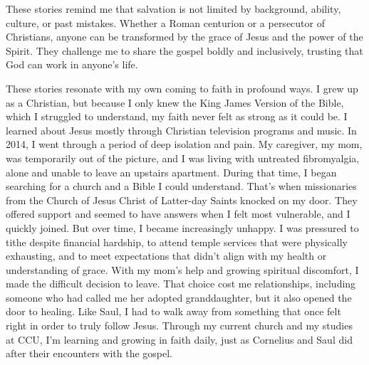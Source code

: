 \documentclass[12pt,letterpaper]{article}
\begin{document}
These stories remind me that salvation is not limited by background, ability, culture, or past mistakes. Whether a Roman centurion or a persecutor of Christians, anyone can be transformed by the grace of Jesus and the power of the Spirit. They challenge me to share the gospel boldly and inclusively, trusting that God can work in anyone’s life.

These stories resonate with my own coming to faith in profound ways. I grew up as a Christian, but because I only knew the King James Version of the Bible, which I struggled to understand, my faith never felt as strong as it could be. I learned about Jesus mostly through Christian television programs and music. In 2014, I went through a period of deep isolation and pain. My caregiver, my mom, was temporarily out of the picture, and I was living with untreated fibromyalgia, alone and unable to leave an upstairs apartment. During that time, I began searching for a church and a Bible I could understand. That’s when missionaries from the Church of Jesus Christ of Latter-day Saints knocked on my door. They offered support and seemed to have answers when I felt most vulnerable, and I quickly joined. But over time, I became increasingly unhappy. I was pressured to tithe despite financial hardship, to attend temple services that were physically exhausting, and to meet expectations that didn’t align with my health or understanding of grace. With my mom’s help and growing spiritual discomfort, I made the difficult decision to leave. That choice cost me relationships, including someone who had called me her adopted granddaughter, but it also opened the door to healing. Like Saul, I had to walk away from something that once felt right in order to truly follow Jesus. Through my current church and my studies at CCU, I’m learning and growing in faith daily, just as Cornelius and Saul did after their encounters with the gospel.

\newpage

\printbibliography[heading=bibintoc]
\end{document}
